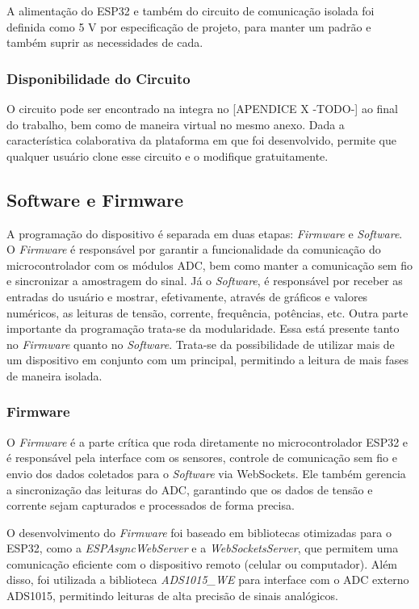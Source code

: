A alimentação do ESP32 e também do circuito de comunicação isolada foi definida como 5 V por especificação de projeto, para manter um padrão e também suprir as necessidades de cada.

\subsubsection{Disponibilidade do Circuito}\label{availability}

O circuito pode ser encontrado na integra no [APENDICE X -TODO-] ao final do trabalho, bem como de maneira virtual no mesmo anexo. Dada a característica colaborativa da plataforma em que foi desenvolvido, permite que qualquer usuário clone esse circuito e o modifique gratuitamente.

\subsection{Software e Firmware}\label{softfirm}

A programação do dispositivo é separada em duas etapas: \textit{Firmware} e \textit{Software}. O \textit{Firmware} é responsável por garantir a funcionalidade da comunicação do microcontrolador com os módulos \gls{ADC}, bem como manter a comunicação sem fio e sincronizar a amostragem do sinal.
Já o \textit{Software}, é responsável por receber as entradas do usuário e mostrar, efetivamente, através de gráficos e valores numéricos, as leituras de tensão, corrente, frequência, potências, etc.
Outra parte importante da programação trata-se da modularidade. Essa está presente tanto no \textit{Firmware} quanto no \textit{Software}. Trata-se da possibilidade de utilizar mais de um dispositivo em conjunto com um principal, permitindo a leitura de mais fases de maneira isolada.

\subsubsection{Firmware}\label{firmw}

O \textit{Firmware} é a parte crítica que roda diretamente no microcontrolador ESP32 e é responsável pela interface com os sensores, controle de comunicação sem fio e envio dos dados coletados para o \textit{Software} via WebSockets. Ele também gerencia a sincronização das leituras do ADC, garantindo que os dados de tensão e corrente sejam capturados e processados de forma precisa.

O desenvolvimento do \textit{Firmware} foi baseado em bibliotecas otimizadas para o ESP32, como a \textit{ESPAsyncWebServer} e a \textit{WebSocketsServer}, que permitem uma comunicação eficiente com o dispositivo remoto (celular ou computador). Além disso, foi utilizada a biblioteca \textit{ADS1015\_WE} para interface com o ADC externo ADS1015, permitindo leituras de alta precisão de sinais analógicos.

